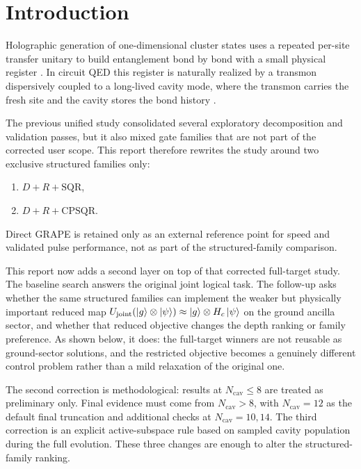 ﻿\documentclass[aps,pra,twocolumn,reprint,amsmath,amssymb,floatfix]{revtex4-2}
\begin{document}
\maketitle

\section{Introduction}

Holographic generation of one-dimensional cluster states uses a repeated
per-site transfer unitary to build entanglement bond by bond with a small
physical register \cite{raussendorf2001one,briegel2001persistent}.
In circuit QED this register is naturally realized by a transmon dispersively
coupled to a long-lived cavity mode, where the transmon carries the fresh site
and the cavity stores the bond history \cite{blais2021circuit,ofek2016extending}.

The previous unified study consolidated several exploratory decomposition and
validation passes, but it also mixed gate families that are not part of the
corrected user scope. This report therefore rewrites the study around two
exclusive structured families only:
\begin{enumerate}
  \item $D + R + \mathrm{SQR}$,
  \item $D + R + \mathrm{CPSQR}$.
\end{enumerate}
Direct GRAPE is retained only as an external reference point for speed and
validated pulse performance, not as part of the structured-family comparison.

This report now adds a second layer on top of that corrected full-target study.
The baseline search answers the original joint logical task. The follow-up asks
whether the same structured families can implement the weaker but physically
important reduced map
$U_{\mathrm{joint}}(\ket{g}\otimes\ket{\psi})\approx
\ket{g}\otimes H_c\ket{\psi}$ on the ground ancilla sector, and whether that
reduced objective changes the depth ranking or family preference. As shown
below, it does: the full-target winners are not reusable as ground-sector
solutions, and the restricted objective becomes a genuinely different control
problem rather than a mild relaxation of the original one.

The second correction is methodological: results at
$N_{\mathrm{cav}}\leq 8$ are treated as preliminary only. Final evidence must
come from $N_{\mathrm{cav}}>8$, with $N_{\mathrm{cav}}=12$ as the default final
truncation and additional checks at $N_{\mathrm{cav}}=10,14$. The third
correction is an explicit active-subspace rule based on sampled cavity
population during the full evolution. These three changes are enough to alter
the structured-family ranking.
\end{document}
